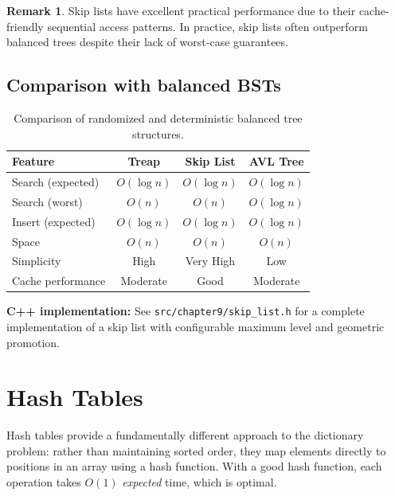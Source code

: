 \documentclass[twoside,12pt]{book}
\theoremstyle{plain}
\theoremstyle{definition}
\newtheorem{remark}[theorem]{Remark}
\theoremstyle{remark}
\newenvironment{cpplisting}{\begin{center}\small}{\end{center}}
\begin{document}
\begin{remark}
Skip lists have excellent practical performance due to their cache-friendly sequential access patterns. In practice, skip lists often outperform balanced trees despite their lack of worst-case guarantees.
\end{remark}

\subsection{Comparison with balanced BSTs}

\begin{table}[H]
\centering
\begin{tabular}{@{}lccc@{}}
\toprule
\textbf{Feature} & \textbf{Treap} & \textbf{Skip List} & \textbf{AVL Tree} \\
\midrule
Search (expected) & $O(\log n)$ & $O(\log n)$ & $O(\log n)$ \\
Search (worst) & $O(n)$ & $O(n)$ & $O(\log n)$ \\
Insert (expected) & $O(\log n)$ & $O(\log n)$ & $O(\log n)$ \\
Space & $O(n)$ & $O(n)$ & $O(n)$ \\
Simplicity & High & Very High & Low \\
Cache performance & Moderate & Good & Moderate \\
\bottomrule
\end{tabular}
\caption{Comparison of randomized and deterministic balanced tree structures.}
\end{table}

\begin{cpplisting}
\textbf{C++ implementation:} See \texttt{src/chapter9/skip\_list.h} for a complete
implementation of a skip list with configurable maximum level and geometric promotion.
\end{cpplisting}

\section{Hash Tables}
\label{sec:hash-tables}

Hash tables provide a fundamentally different approach to the dictionary problem: rather than maintaining sorted order, they map elements directly to positions in an array using a hash function. With a good hash function, each operation takes $O(1)$ \emph{expected} time, which is optimal.
\end{document}
